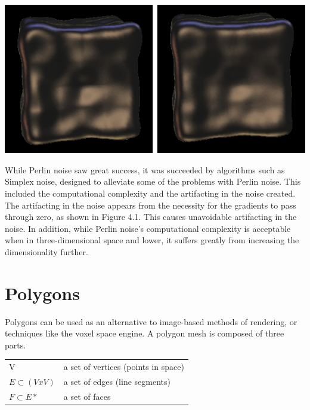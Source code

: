 \documentclass[10pt]{report}
\begin{document}
		\begin{minipage}{\textwidth}
			\centering
			\includegraphics[scale=.5]{s-curve}
			\label{fig:fig6}
		\end{minipage} 
		
		While Perlin noise saw great success, it was succeeded by algorithms such as Simplex noise, designed to alleviate some of the problems with Perlin noise. This included the computational complexity and the artifacting in the noise created. The artifacting in the noise appears from the necessity for the gradients to pass through zero, as shown in Figure 4.1. This causes unavoidable artifacting in the noise. In addition, while Perlin noise's computational complexity is acceptable when in three-dimensional space and lower, it suffers greatly from increasing the dimensionality further.
		

	\vspace{10pt}
	\let\clearpage\relax	
	\chapter{Polygons}
	
		Polygons can be used as an alternative to image-based methods of rendering, or techniques like the voxel space engine. A polygon mesh is composed of three parts.
		
		\begin{center}
			\begin{tabular}{ l l } 
				V & a set of vertices (points in space)\\ 
				$E {\subset} (V x V)$ & a set of edges (line segments)\\ 
				$F {\subset} E*$  & a set of faces \\
			\end{tabular}
		\end{center}
	
\end{document}
